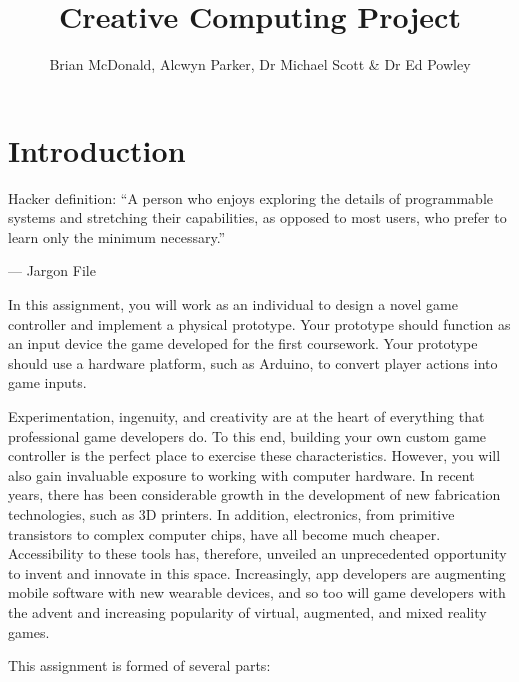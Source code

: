 \documentclass{../../fal_assignment}
\title{Creative Computing Project}
\author{Brian McDonald, Alcwyn Parker, Dr Michael Scott \& Dr Ed Powley}
\begin{document}
\maketitle

\section*{Introduction}

\begin{marginquote}
Hacker definition: ``A person who enjoys exploring the details of programmable systems and stretching their capabilities, as opposed to most users, who prefer to learn only the minimum necessary.''

--- Jargon File

\end{marginquote}

In this assignment, you will work as an individual to design a novel game controller and implement a physical prototype. Your prototype should function as an input device the game developed for the first coursework. Your prototype should use a hardware platform, such as Arduino, to convert player actions into game inputs. 

Experimentation, ingenuity, and creativity are at the heart of everything that professional game developers do. To this end, building your own custom game controller is the perfect place to exercise these characteristics. However, you will also gain invaluable exposure to working with computer hardware. In recent years, there has been considerable growth in the development of new fabrication technologies, such as 3D printers. In addition, electronics, from primitive transistors to complex computer chips, have all become much cheaper. Accessibility to these tools has, therefore, unveiled an unprecedented opportunity to invent and innovate in this space. Increasingly, app developers are augmenting mobile software with new wearable devices, and so too will game developers with the advent and increasing popularity of virtual, augmented, and mixed reality games.


This assignment is formed of several parts:
\end{document}

